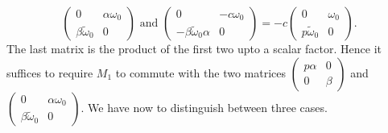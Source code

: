 $$
\begin{pmatrix}
0 & \alpha\omega_{0}\\
\beta\widetilde{\omega}_{0} & 0
\end{pmatrix}
\text{ \  and \ }
\begin{pmatrix}
0 & -c\omega_{0}\\
-\beta\widetilde{\omega}_{0}\alpha & 0
\end{pmatrix}
=-c
\begin{pmatrix}
0 & \omega_{0}\\
p\widetilde{\omega}_{0} & 0
\end{pmatrix}.
$$
The last matrix is the product of the first two upto a scalar
factor. Hence it suffices to require $M_{1}$ to commute with the two
matrices $\left(\begin{smallmatrix} p\alpha & 0 \\ 0 & \beta
\end{smallmatrix}\right)$ and $\left(\begin{smallmatrix} 0 &
  \alpha\omega_{0}\\ \beta\widetilde{\omega}_{0} & 0
\end{smallmatrix}\right)$. We have now to distinguish between three
cases. 
